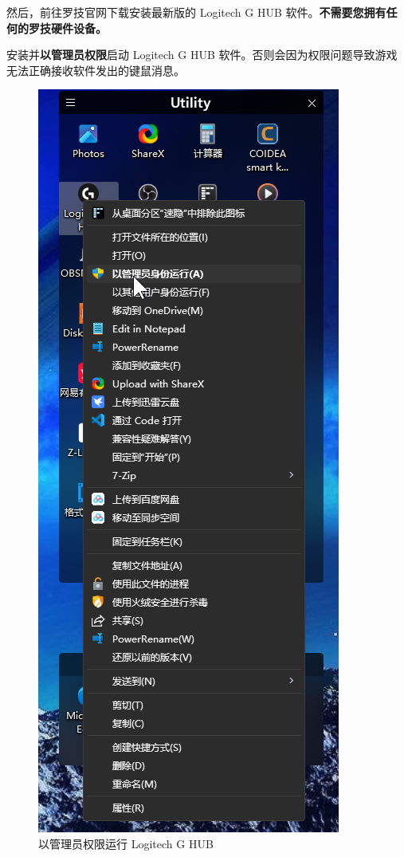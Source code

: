 然后，前往罗技官网下载安装最新版的 Logitech G HUB 软件。\textbf{不需要您拥有任何的罗技硬件设备。}

安装并\textbf{以管理员权限}启动 Logitech G HUB 软件。否则会因为权限问题导致游戏无法正确接收软件发出的键鼠消息。

\begin{figure}[H]
    \Centering
    \includegraphics[width=\textwidth]{docs/assets/run_lghub.png}
    \caption{以管理员权限运行 Logitech G HUB}
\end{figure}

